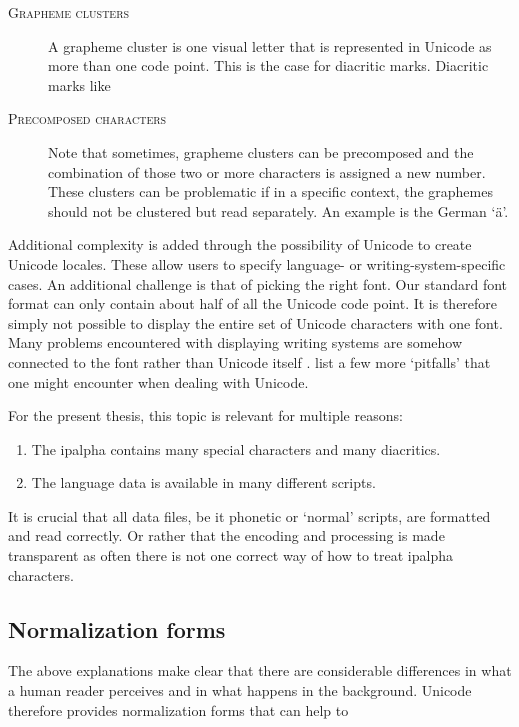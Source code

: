 \begin{description}
\item[\textsc{Grapheme clusters}] A grapheme cluster is one visual letter that is represented in Unicode as more than one code point. This is the case for diacritic marks. Diacritic marks like
\item[\textsc{Precomposed characters}] Note that sometimes, grapheme clusters can be precomposed and the combination of those two or more characters is assigned a new number. These clusters can be problematic if in a specific context, the graphemes should not be clustered but read separately. An example is the German `ä'. 
\end{description} 

Additional complexity is added through the possibility of Unicode to create Unicode locales. These allow users to specify language- or writing-system-specific cases. An additional challenge is that of picking the right font. Our standard font format can only contain about half of all the Unicode code point. It is therefore simply not possible to display the entire set of Unicode characters with one font. Many problems encountered with displaying writing systems are somehow connected to the font rather than Unicode itself \citep{unicode-lingu}. \citet{unicode-lingu} list a few more `pitfalls' that one might encounter when dealing with Unicode.

For the present thesis, this topic is relevant for multiple reasons: 
\begin{enumerate}
\item The \ac{ipalpha} contains many special characters and many diacritics.
\item The language data is available in many different scripts.
\end{enumerate} 

It is crucial that all data files, be it phonetic or `normal' scripts, are formatted and read correctly. Or rather that the encoding and processing is made transparent as often there is not one correct way of how to treat \ac{ipalpha} characters. 

\subsection{Normalization forms}
The above explanations make clear that there are considerable differences in what a human reader perceives and in what happens in the background. Unicode therefore provides normalization forms that can help to 

